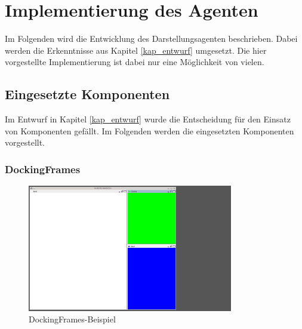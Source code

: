 \documentclass[a4paper,12pt,oneside,openright,onecolumn,final,titlepage,fleqn,ngerman]{scrreprt}
\newcommand{\repag}{Darstellungsagent}
\begin{document}
	\chapter{Implementierung des Agenten}\label{kap_implementation}
	Im Folgenden wird die Entwicklung des \repag{}en beschrieben. Dabei werden die Erkenntnisse aus Kapitel \ref{kap_entwurf} umgesetzt. Die hier vorgestellte Implementierung ist dabei nur eine Möglichkeit von vielen.

	\section{Eingesetzte Komponenten}
	Im Entwurf in Kapitel \ref{kap_entwurf} wurde die Entscheidung für den Einsatz von Komponenten gefällt. Im Folgenden werden die eingesetzten Komponenten vorgestellt.
	
	\subsection{DockingFrames}\label{kap_DockingFrames}
	\begin{figure}[ht]
		\centering
		\includegraphics[keepaspectratio=true,width=0.8\textwidth]{res/DF_int.png}
		\caption{DockingFrames-Beispiel}
		\label{pic_df_int}
	\end{figure}
	
\end{document}
